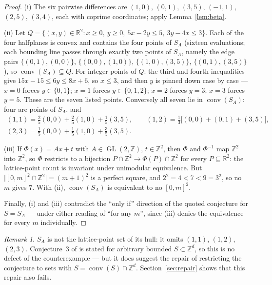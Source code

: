 \documentclass[11pt]{article}
\theoremstyle{remark}
\newtheorem{remark}[theorem]{Remark}
\newcommand{\Z}{\mathbb{Z}}
\newcommand{\R}{\mathbb{R}}
\newcommand{\conv}{\operatorname{conv}}
\newcommand{\GL}{\operatorname{GL}}
\begin{document}
\begin{proof}
(i) The six pairwise differences are $(1,0)$, $(0,1)$, $(3,5)$, $(-1,1)$,
$(2,5)$, $(3,4)$, each with coprime coordinates; apply
Lemma~\ref{lem:beta}.

(ii) Let
$Q = \{(x,y) \in \R^2 : x \ge 0,\ y \ge 0,\ 5x - 2y \le 5,\ 3y - 4x \le 3\}$.
Each of the four halfplanes is convex and contains the four points of $S_A$
(sixteen evaluations; each bounding line passes through exactly two points of
$S_A$, namely the edge pairs $\{(0,1),(0,0)\}$, $\{(0,0),(1,0)\}$,
$\{(1,0),(3,5)\}$, $\{(0,1),(3,5)\}$), so $\conv(S_A) \subseteq Q$. For
integer points of $Q$: the third and fourth inequalities give
$15x - 15 \le 6y \le 8x + 6$, so $x \le 3$, and then $y$ is pinned down case
by case --- $x = 0$ forces $y \in \{0,1\}$; $x = 1$ forces $y \in \{0,1,2\}$;
$x = 2$ forces $y = 3$; $x = 3$ forces $y = 5$. These are the seven listed
points. Conversely all seven lie in $\conv(S_A)$: four are points of $S_A$,
and
\begin{gather*}
(1,1) = \tfrac{2}{5}(0,0) + \tfrac{2}{5}(1,0) + \tfrac{1}{5}(3,5), \qquad
(1,2) = \tfrac{1}{3}\bigl[(0,0) + (0,1) + (3,5)\bigr],\\
(2,3) = \tfrac{1}{5}(0,0) + \tfrac{1}{5}(1,0) + \tfrac{3}{5}(3,5).
\end{gather*}

(iii) If $\Phi(x) = Ax + t$ with $A \in \GL(2,\Z)$, $t \in \Z^2$, then $\Phi$
and $\Phi^{-1}$ map $\Z^2$ into $\Z^2$, so $\Phi$ restricts to a bijection
$P \cap \Z^2 \to \Phi(P) \cap \Z^2$ for every $P \subseteq \R^2$: the
lattice-point count is invariant under unimodular equivalence. But
$\bigl|[0,m]^2 \cap \Z^2\bigr| = (m+1)^2$ is a perfect square, and
$2^2 = 4 < 7 < 9 = 3^2$, so no $m$ gives $7$. With (ii), $\conv(S_A)$ is
equivalent to no $[0,m]^2$.

Finally, (i) and (iii) contradict the ``only if'' direction of the quoted
conjecture for $S = S_A$ --- under either reading of ``for any $m$'', since
(iii) denies the equivalence for every $m$ individually.
\end{proof}

\begin{remark}
$S_A$ is not the lattice-point set of its hull: it omits $(1,1)$, $(1,2)$,
$(2,3)$. Conjecture~3 of \cite{BDLT2025} is stated for arbitrary bounded
$S \subset \Z^d$, so this is no defect of the counterexample --- but it does
suggest the repair of restricting the conjecture to sets with
$S = \conv(S) \cap \Z^d$. Section~\ref{sec:repair} shows that this repair
also fails.
\end{remark}
\end{document}
